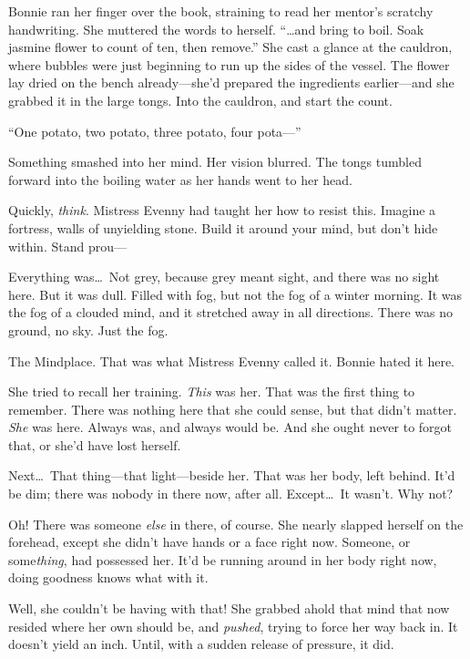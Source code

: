 Bonnie ran her finger over the book, straining to read her mentor's scratchy handwriting.
She muttered the words to herself.
``{\dots}and bring to boil. Soak jasmine flower to count of ten, then remove.''
She cast a glance at the cauldron, where bubbles were just beginning to run up the sides of the vessel.
The flower lay dried on the bench already---she'd prepared the ingredients earlier---and she grabbed it in the large tongs.
Into the cauldron, and start the count.

``One potato, two potato, three potato, four pota---''


Something smashed into her mind.
Her vision blurred.
The tongs tumbled forward into the boiling water as her hands went to her head.

Quickly, \emph{think}.
Mistress Evenny had taught her how to resist this.
Imagine a fortress, walls of unyielding stone.
Build it around your mind, but don't hide within.
Stand prou---


Everything was{\dots}\ Not grey, because grey meant sight, and there was no sight here.
But it was dull.
Filled with fog, but not the fog of a winter morning.
It was the fog of a clouded mind, and it stretched away in all directions.
There was no ground, no sky.
Just the fog.

The Mindplace.
That was what Mistress Evenny called it.
Bonnie hated it here.

She tried to recall her training.
\emph{This} was her.
That was the first thing to remember.
There was nothing here that she could sense, but that didn't matter.
\emph{She} was here.
Always was, and always would be.
And she ought never to forgot that, or she'd have lost herself.

Next{\dots}\ That thing---that light---beside her.
That was her body, left behind.
It'd be dim; there was nobody in there now, after all.
Except{\dots}\ It wasn't.
Why not?

Oh!
There was someone \emph{else} in there, of course.
She nearly slapped herself on the forehead, except she didn't have hands or a face right now.
Someone, or some\emph{thing}, had possessed her.
It'd be running around in her body right now, doing goodness knows what with it.

Well, she couldn't be having with that!
She grabbed ahold that mind that now resided where her own should be, and \emph{pushed}, trying to force her way back in.
It doesn't yield an inch.
Until, with a sudden release of pressure, it did.


